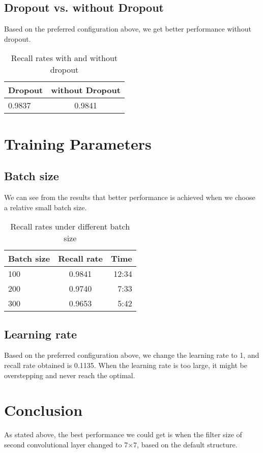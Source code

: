 \documentclass[a4paper]{article}
\begin{document}
\subsection{Dropout vs. without Dropout}
Based on the preferred configuration above, we get better performance without dropout.
\begin{table}[!htbp]
\centering
\begin{tabular}{l|c}
Dropout & without Dropout \\\hline
0.9837 & 0.9841 \\

\end{tabular}
\caption{\label{tab:widgets}Recall rates with and without dropout }
\end{table}



\section{Training Parameters}

\subsection{Batch size}
We can see from the results that better performance is achieved when we choose a relative small batch size.
\begin{table}[!htbp]
\centering
\begin{tabular}{l|c|r}
Batch size & Recall rate & Time \\\hline
100 & 0.9841 & 12:34 \\
200 & 0.9740 & 7:33 \\
300 & 0.9653 & 5:42 \\
\end{tabular}
\caption{\label{tab:widgets}Recall rates under different batch size}
\end{table}


\subsection{Learning rate}
Based on the preferred configuration above, we change the learning rate to 1, and recall rate obtained is 0.1135. When the learning rate is too large, it might be overstepping and never reach the optimal.

\section{Conclusion}
As stated above, the best performance we could get is when the filter size of second convolutional layer changed to 7$\times7$, based on the default structure. 
\end{document}
